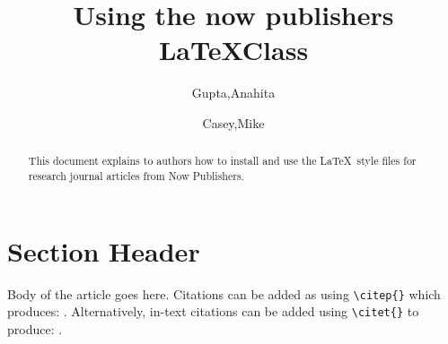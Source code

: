 \documentclass[example,biber]{now-journal} %
\title{Using the now publishers \LaTeX Class}
\author[1*]{Gupta,Anahita}
\author[1]{Casey,Mike}
\affil[1]{now publishers, Inc.}
\begin{document}
\begin{abstract}
This document explains to authors how to install and use the \LaTeX\ style files for research journal articles from Now Publishers.
\end{abstract}

\section{Section Header}
\label{s-section1}

Body of the article goes here. Citations can be added as using \texttt{\textbackslash citep\{\}} which produces: \citep{armonth}. Alternatively, in-text citations can be added using \texttt{\textbackslash citet\{\}} to produce: \citet{bvolume}.

\printbibliography
\end{document}
